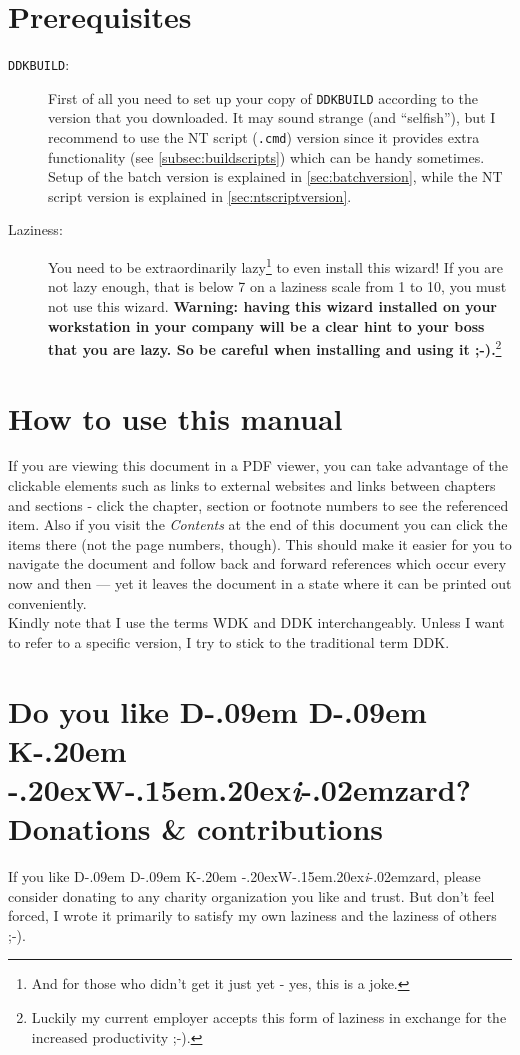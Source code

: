 \documentclass[a4paper,titlepage]{report}
\def\ddkwiz{D\kern-.09em D\kern-.09em K\kern-.20em \raise-.20ex\hbox{W}\kern-.15em\raise.20ex\hbox{\it{i}}\kern-.02em{zard}}
\begin{document}
\section*{Prerequisites}
\begin{description}
  \item[\texttt{DDKBUILD}:] First of all you need to set up your copy of \texttt{DDKBUILD} according to the version
that you downloaded. It may sound strange (and ``selfish''), but I recommend to
use the NT script (\texttt{.cmd}) version since it provides extra functionality
(see \autoref{subsec:buildscripts})
which can be handy sometimes. Setup of the batch version is explained in \autoref{sec:batchversion},
while the NT script version is explained in \autoref{sec:ntscriptversion}.
  \item[Laziness:]
  You need to be extraordinarily lazy\footnote{And for those who didn't get it just yet - yes, this is a joke.}
  to even install this wizard! If you are not lazy enough, that is below 7 on a laziness scale from 1 to 10, you
must not use this wizard.
\textbf{Warning: having this wizard installed on your workstation in your
company will be a clear hint to your boss that you are lazy. So be careful when
installing and using it \textsf{;-)}.}\footnote{Luckily my current employer accepts
this form of laziness in exchange for the increased productivity \textsf{;-)}.}
\end{description}

\section*{How to use this manual}
If you are viewing this document in a PDF viewer, you can take advantage of the
clickable elements such as links to external websites and links between
chapters and sections - click the chapter, section or footnote numbers to
see the referenced item. Also if you visit the \emph{Contents} at the end of
this document you can click the items there (not the page numbers, though).
This should make it easier for you to navigate the document and follow
back and forward references which occur every now and then --- yet it leaves
the document in a state where it can be printed out conveniently.\\
Kindly note that I use the terms WDK and DDK interchangeably. Unless I want to
refer to a specific version, I try to stick to the traditional term DDK.

\section*{Do you like \ddkwiz{}? Donations \& contributions}
If you like \ddkwiz{}, please consider donating to any charity organization you
like and trust. But don't feel forced, I wrote
it primarily to satisfy my own laziness and the laziness of others \textsf{;-)}.\\
\end{document}

